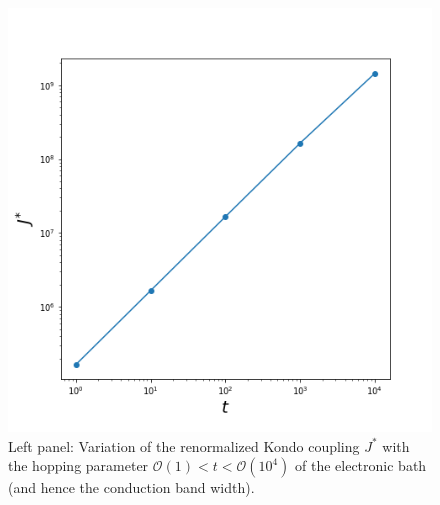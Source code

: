 \documentclass[aps,prb,preprint,groupedaddress]{revtex4-2}
\begin{document}
\begin{figure}[ht!]
\includegraphics[scale=0.5]{KondoCouplingVst.png}
\caption{Left panel: Variation of the renormalized Kondo coupling $J^{*}$ with the hopping parameter $\mathcal{O}(1)<t<\mathcal{O}(10^{4})$ of the electronic bath (and hence the conduction band width).}\label{infinite}
\end{figure}
\end{document}
